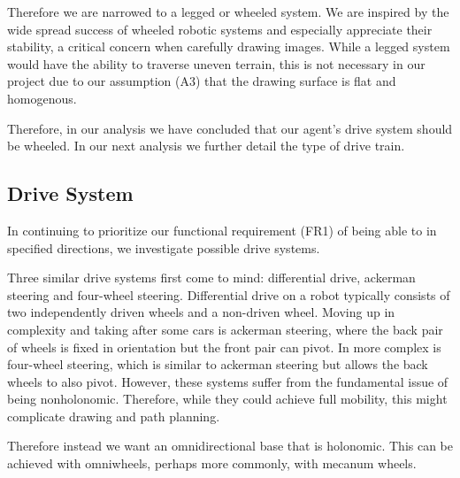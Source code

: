 Therefore we are narrowed to a legged or wheeled system.  We are inspired by the wide spread success of wheeled robotic systems and especially appreciate their stability, a critical concern when carefully drawing images. While a legged system would have the ability to traverse uneven terrain, this is not necessary in our project due to our assumption (A3) that the drawing surface is flat and homogenous. 

Therefore, in our analysis we have concluded that our agent's drive system should be wheeled. In our next analysis we further detail the type of drive train. 

\subsection{Drive System}
\label{sec:trade_drive}
In continuing to prioritize our functional requirement (FR1) of being able to in specified directions, we investigate possible drive systems. 

Three similar drive systems first come to mind: differential drive, ackerman steering and four-wheel steering. Differential drive on a robot typically consists of two independently driven wheels and a non-driven wheel. Moving up in complexity and taking after some cars is ackerman steering, where the back pair of wheels is fixed in orientation but the front pair can pivot. In more complex is four-wheel steering, which is similar to ackerman steering but allows the back wheels to also pivot. However, these systems suffer from the fundamental issue of being nonholonomic. Therefore, while they could achieve full mobility, this might complicate drawing and path planning. 

Therefore instead we want an omnidirectional base that is holonomic. This can be achieved with omniwheels, perhaps more commonly, with mecanum wheels. 


